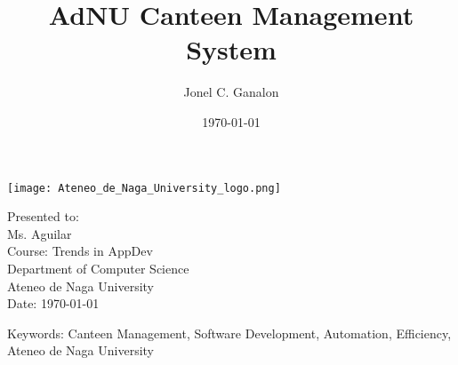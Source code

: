 \documentclass{article}
\title{AdNU Canteen Management System}
\author{Jonel C. Ganalon}
\date{\today} %
\begin{document}
\maketitle

\thispagestyle{empty} %

\begin{center}
    \vspace{2cm} %
    \texttt{[image: Ateneo\_de\_Naga\_University\_logo.png]} %

    \vspace{2cm} %
    Presented to: \\
    Ms. Aguilar \\
    Course: Trends in AppDev \\
    Department of Computer Science \\
    Ateneo de Naga University \\
    \vspace{1cm} %
    Date: \today
    
    \vspace{0.5cm} %
    Keywords: Canteen Management, Software Development, Automation, Efficiency, Ateneo de Naga University
\end{center}
\end{document}
